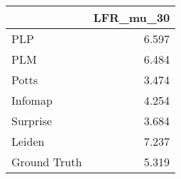 \begin{tabular}{lr}
\toprule
{} & LFR_mu_30 \\
\midrule
PLP          &     6.597 \\
PLM          &     6.484 \\
Potts        &     3.474 \\
Infomap      &     4.254 \\
Surprise     &     3.684 \\
Leiden       &     7.237 \\
Ground Truth &     5.319 \\
\bottomrule
\end{tabular}
